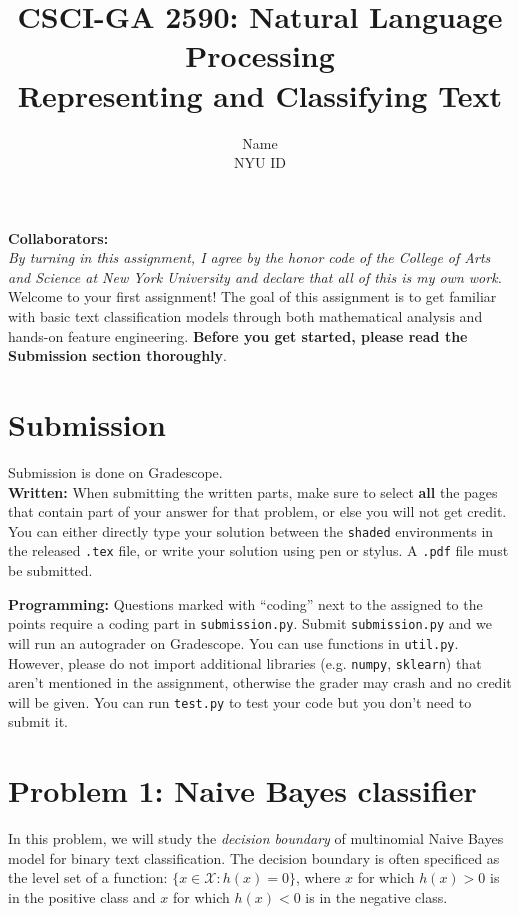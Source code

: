 \documentclass{article}
\title{\textbf{CSCI-GA 2590: Natural Language Processing} \\Representing and Classifying Text}
\author{Name \\
NYU ID}
\date{}
\theoremstyle{case}
\theoremstyle{definition}
\begin{document}
\maketitle

\textbf{Collaborators:} \\
\textit{By turning in this assignment, I agree by the honor code of the College of Arts and Science at New York University and declare
that all of this is my own work.} \\

Welcome to your first assignment! The goal of this assignment is to get familiar with basic text classification models through both mathematical analysis and hands-on feature engineering.
\textbf{Before you get started, please read the Submission section thoroughly}.

\section*{Submission}
Submission is done on Gradescope. \\

\textbf{Written:} When submitting the written parts, make sure to select \textbf{all} the pages that contain part of your answer for that problem, or else you will not get credit.
You can either directly type your solution between the \texttt{shaded} environments in the released \texttt{.tex} file,
or write your solution using pen or stylus. 
A \texttt{.pdf} file must be submitted.

\textbf{Programming:} Questions marked with ``coding'' next to the assigned to the points require a coding part in \texttt{submission.py}.
Submit \texttt{submission.py} and we will run an autograder on Gradescope. You can use functions in \texttt{util.py}. However, please do not import additional libraries (e.g. \texttt{numpy}, \texttt{sklearn}) that aren't mentioned in the assignment, otherwise the grader may crash and no credit will be given.
You can run \texttt{test.py} to test your code but you don't need to submit it.


\section*{Problem 1: Naive Bayes classifier}
In this problem, we will study the \emph{decision boundary} of multinomial Naive Bayes model for binary text classification.
The decision boundary is often specificed as the level set of a function:
$\{x\in\mathcal{X} : h(x) = 0\}$,
where $x$ for which $h(x) > 0$ is in the positive class and
$x$ for which $h(x) < 0$ is in the negative class.
\end{document}
